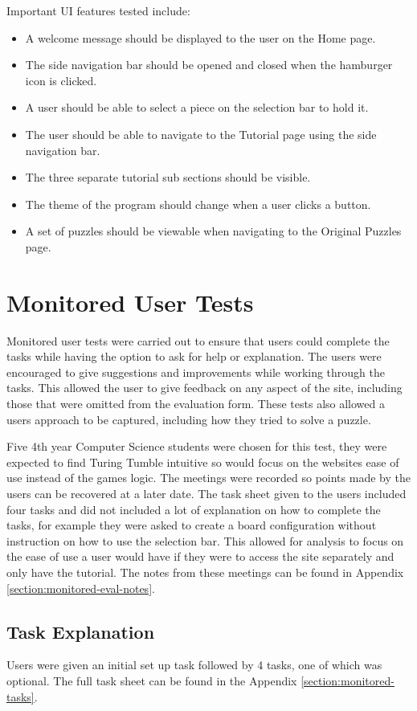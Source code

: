 \documentclass{l4proj}
\begin{document}
Important UI features tested include:
\begin{itemize}
    \item A welcome message should be displayed to the user on the Home page.
    \item The side navigation bar should be opened and closed when the hamburger icon is clicked.
    \item A user should be able to select a piece on the selection bar to hold it.
    \item The user should be able to navigate to the Tutorial page using the side navigation bar.
    \item The three separate tutorial sub sections should be visible.
    \item The theme of the program should change when a user clicks a button.
    \item A set of puzzles should be viewable when navigating to the Original Puzzles page.
\end{itemize}

\section{Monitored User Tests}
Monitored user tests were carried out to ensure that users could complete the tasks while having the option to ask for help or explanation. The users were encouraged to give suggestions and improvements while working through the tasks. This allowed the user to give feedback on any aspect of the site, including those that were omitted from the evaluation form. These tests also allowed a users approach to be captured, including how they tried to solve a puzzle. 

Five 4th year Computer Science students were chosen for this test, they were expected to find Turing Tumble intuitive so would focus on the websites ease of use instead of the games logic. The meetings were recorded so points made by the users can be recovered at a later date. The task sheet given to the users included four tasks and did not included a lot of explanation on how to complete the tasks, for example they were asked to create a board configuration without instruction on how to use the selection bar. This allowed for analysis to focus on the ease of use a user would have if they were to access the site separately and only have the tutorial. The notes from these meetings can be found in Appendix \ref{section:monitored-eval-notes}.

\subsection{Task Explanation}
\label{taskExplanation}
Users were given an initial set up task followed by 4 tasks, one of which was optional. The full task sheet can be found in the Appendix \ref{section:monitored-tasks}. 
\end{document}

